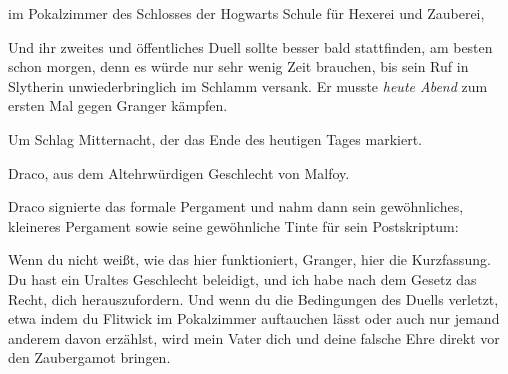 \begin{writtenNote}
im Pokalzimmer des Schlosses der Hogwarts Schule für Hexerei und Zauberei,
\end{writtenNote}

Und ihr zweites und öffentliches Duell sollte besser bald stattfinden, am besten schon morgen, denn es würde nur sehr wenig Zeit brauchen, bis sein Ruf in Slytherin unwiederbringlich im Schlamm versank. Er musste \emph{heute Abend} zum ersten Mal gegen Granger kämpfen.

\begin{writtenNote}
Um Schlag Mitternacht, der das Ende des heutigen Tages markiert.

Draco, aus dem Altehrwürdigen Geschlecht von Malfoy.
\end{writtenNote}

Draco signierte das formale Pergament und nahm dann sein gewöhnliches, kleineres Pergament sowie seine gewöhnliche Tinte für sein Postskriptum:

\begin{writtenNote}
Wenn du nicht weißt, wie das hier funktioniert, Granger, hier die Kurzfassung. Du hast ein Uraltes Geschlecht beleidigt, und ich habe nach dem Gesetz das Recht, dich herauszufordern. Und wenn du die Bedingungen des Duells verletzt, etwa indem du Flitwick im Pokalzimmer auftauchen lässt oder auch nur jemand anderem davon erzählst, wird mein Vater dich und deine falsche Ehre direkt vor den Zaubergamot bringen.

\end{writtenNote}

